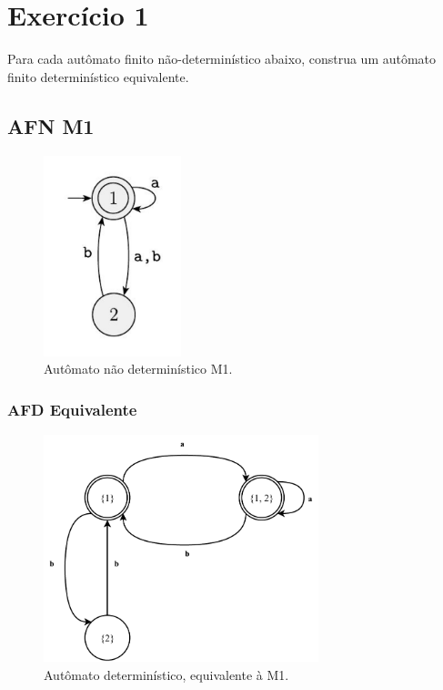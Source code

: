 \documentclass[a4paper, 12pt]{article}
\begin{document}
\newpage
\tableofcontents
\thispagestyle{empty}

\newpage
{}

\newpage
\section{Exercício 1}

Para cada autômato finito não-determinístico abaixo, construa um autômato finito determinístico equivalente.

\subsection{AFN M1}

\begin{figure}[!ht]
    \centering
    \includegraphics[width=4cm]{./imgs/task-1-afn1.png}
    \caption{Autômato não determinístico M1.}
    \label{fig:afn1}
\end{figure}

\subsubsection{AFD Equivalente}

\begin{figure}[!ht]
    \centering
    \includegraphics[width=8cm]{./imgs/afd-1.pdf}
    \caption{Autômato determinístico, equivalente à M1.}
    \label{fig:afd1}
\end{figure}
\end{document}
